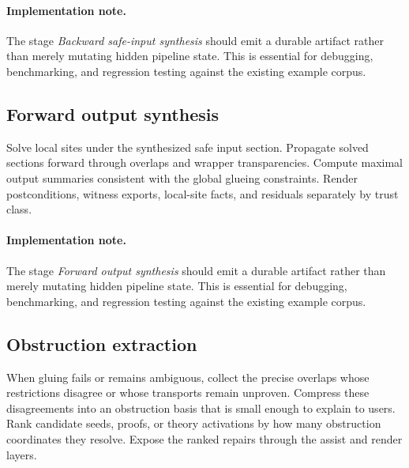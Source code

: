 \documentclass[11pt]{report}
\theoremstyle{definition}
\theoremstyle{plain}
\begin{document}
\paragraph{Implementation note.}
The stage \emph{Backward safe-input synthesis} should emit a durable artifact rather than merely
mutating hidden pipeline state. This is essential for debugging, benchmarking,
and regression testing against the existing example corpus.

\subsection{Forward output synthesis}

\begin{algorithm}[H]
\caption{Sheaf-descent stage: Forward output synthesis}
\begin{algorithmic}[1]
\State Solve local sites under the synthesized safe input section.
\State Propagate solved sections forward through overlaps and wrapper transparencies.
\State Compute maximal output summaries consistent with the global glueing constraints.
\State Render postconditions, witness exports, local-site facts, and residuals separately by trust class.
\end{algorithmic}
\end{algorithm}


\paragraph{Implementation note.}
The stage \emph{Forward output synthesis} should emit a durable artifact rather than merely
mutating hidden pipeline state. This is essential for debugging, benchmarking,
and regression testing against the existing example corpus.

\subsection{Obstruction extraction}

\begin{algorithm}[H]
\caption{Sheaf-descent stage: Obstruction extraction}
\begin{algorithmic}[1]
\State When gluing fails or remains ambiguous, collect the precise overlaps whose restrictions disagree or whose transports remain unproven.
\State Compress these disagreements into an obstruction basis that is small enough to explain to users.
\State Rank candidate seeds, proofs, or theory activations by how many obstruction coordinates they resolve.
\State Expose the ranked repairs through the assist and render layers.
\end{algorithmic}
\end{algorithm}
\end{document}
